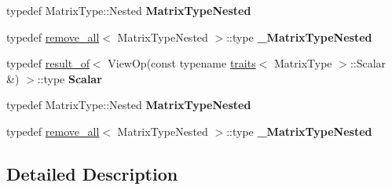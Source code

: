 \begin{DoxyCompactItemize}
\item 
\mbox{\label{struct_eigen_1_1internal_1_1traits_3_01_cwise_unary_view_3_01_view_op_00_01_matrix_type_01_4_01_4_abea5f8e7606b96895780857b0b6106e3}} 
typedef Matrix\+Type\+::\+Nested {\bfseries Matrix\+Type\+Nested}
\item 
\mbox{\label{struct_eigen_1_1internal_1_1traits_3_01_cwise_unary_view_3_01_view_op_00_01_matrix_type_01_4_01_4_af439e90a224f9a012a2cc6ee5182929e}} 
typedef \hyperlink{struct_eigen_1_1internal_1_1remove__all}{remove\+\_\+all}$<$ Matrix\+Type\+Nested $>$\+::type {\bfseries \+\_\+\+Matrix\+Type\+Nested}
\item 
\mbox{\label{struct_eigen_1_1internal_1_1traits_3_01_cwise_unary_view_3_01_view_op_00_01_matrix_type_01_4_01_4_ae388eca20138f05948bdcc57b1cf4af7}} 
typedef \hyperlink{struct_eigen_1_1internal_1_1result__of}{result\+\_\+of}$<$ View\+Op(const typename \hyperlink{struct_eigen_1_1internal_1_1traits}{traits}$<$ Matrix\+Type $>$\+::Scalar \&) $>$\+::type {\bfseries Scalar}
\item 
\mbox{\label{struct_eigen_1_1internal_1_1traits_3_01_cwise_unary_view_3_01_view_op_00_01_matrix_type_01_4_01_4_abea5f8e7606b96895780857b0b6106e3}} 
typedef Matrix\+Type\+::\+Nested {\bfseries Matrix\+Type\+Nested}
\item 
\mbox{\label{struct_eigen_1_1internal_1_1traits_3_01_cwise_unary_view_3_01_view_op_00_01_matrix_type_01_4_01_4_af439e90a224f9a012a2cc6ee5182929e}} 
typedef \hyperlink{struct_eigen_1_1internal_1_1remove__all}{remove\+\_\+all}$<$ Matrix\+Type\+Nested $>$\+::type {\bfseries \+\_\+\+Matrix\+Type\+Nested}
\end{DoxyCompactItemize}


\subsection{Detailed Description}
